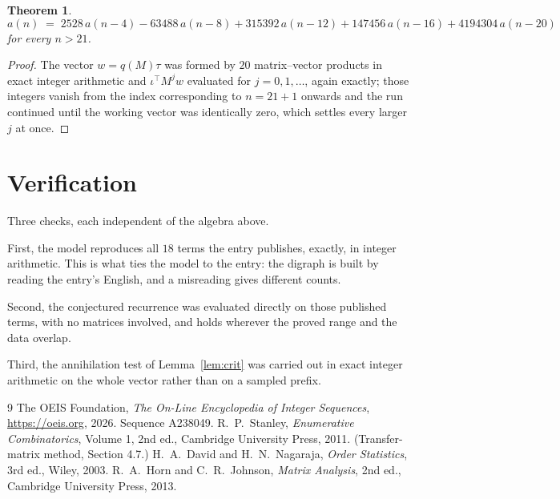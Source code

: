 \documentclass[11pt,a4paper]{article}
\theoremstyle{plain}
\newtheorem{theorem}{Theorem}
\theoremstyle{definition}
\begin{document}
\begin{theorem}
\[
a(n)\;=\;2528\,a(n-4) - 63488\,a(n-8) + 315392\,a(n-12) + 147456\,a(n-16) + 4194304\,a(n-20)
\]
for every $n>21$.
\end{theorem}

\begin{proof}
The vector $w=q(M)\tau$ was formed by $20$ matrix--vector products in exact integer
arithmetic and $\iota^{\!\top}M^{j}w$ evaluated for $j=0,1,\dots$, again exactly; those
integers vanish from the index corresponding to $n=21+1$ onwards and the run continued
until the working vector was identically zero, which settles every larger $j$ at once.
\end{proof}

\section{Verification}

Three checks, each independent of the algebra above.

First, the model reproduces all $18$ terms the entry publishes, exactly, in integer
arithmetic. This is what ties the model to the entry: the digraph is built by reading the
entry's English, and a misreading gives different counts.

Second, the conjectured recurrence was evaluated directly on those published terms, with no
matrices involved, and holds wherever the proved range and the data overlap.

Third, the annihilation test of Lemma~\ref{lem:crit} was carried out in exact integer
arithmetic on the whole vector rather than on a sampled prefix.

\begin{thebibliography}{9}
 The OEIS Foundation, \emph{The On-Line Encyclopedia of Integer
Sequences}, \url{https://oeis.org}, 2026. Sequence A238049.
 R.~P.~Stanley, \emph{Enumerative Combinatorics}, Volume 1, 2nd ed.,
Cambridge University Press, 2011. (Transfer-matrix method, Section 4.7.)
 H.~A.~David and H.~N.~Nagaraja, \emph{Order Statistics}, 3rd ed., Wiley,
2003.
 R.~A.~Horn and C.~R.~Johnson, \emph{Matrix Analysis}, 2nd ed., Cambridge
University Press, 2013.
\end{thebibliography}
\end{document}
